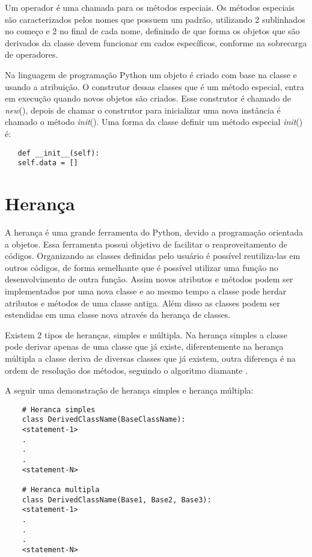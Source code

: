	Um operador é uma chamada para os métodos especiais. Os métodos especiais são caracterizados pelos nomes que possuem um padrão, utilizando 2 sublinhados no começo e 2 no final de cada nome, definindo de que forma os objetos que são derivados da classe devem funcionar em cados específicos, conforme na sobrecarga de operadores.
	
	 Na linguagem de programação Python um objeto é criado com base na classe e usando a atribuição. O construtor dessas classes que é um método especial, entra em execução quando novos objetos são criados. Esse construtor é chamado de \textunderscore\textunderscore \textit{new}\textunderscore\textunderscore(), depois de chamar o construtor para inicializar uma nova instância é chamado o método \textunderscore\textunderscore \textit{init}\textunderscore\textunderscore(). Uma forma da classe definir um método especial \textunderscore\textunderscore \textit{init}\textunderscore\textunderscore() é:
	 \begin{lstlisting}
   def __init__(self):
   self.data = []
	 \end{lstlisting}
	 
	
    \section{Herança}
	A herança é uma grande ferramenta do Python, devido a programação orientada a objetos. Essa ferramenta possui objetivo de facilitar o reaproveitamento de códigos. Organizando as classes definidas pelo usuário é possível reutiliza-las em outros códigos, de forma semelhante que é possível utilizar uma função no desenvolvimento de outra função. Assim novos atributos e métodos podem ser implementados por uma nova classe e ao mesmo tempo a classe pode herdar atributos e métodos de uma classe antiga. Além disso as classes podem ser estendidas em uma classe nova através da herança de classes. 
	
	Existem 2 tipos de heranças, simples e múltipla. Na herança simples a classe pode derivar apenas de uma classe que já existe, diferentemente na herança múltipla a classe deriva de diversas classes que já existem, outra diferença é na ordem de resolução dos métodos, seguindo o algoritmo diamante \cite{Borges2014}.
	
	A seguir uma demonstração de herança simples e herança múltipla: 
	
	\begin{lstlisting}
    # Heranca simples
    class DerivedClassName(BaseClassName):
    <statement-1>
    .
    .
    .
    <statement-N>
		
    # Heranca multipla
    class DerivedClassName(Base1, Base2, Base3):
    <statement-1>
    .
    .
    .
    <statement-N>
	\end{lstlisting}
